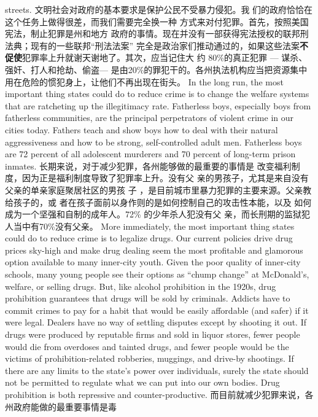 \begin{paracol}{2}
streets.
\switchcolumn
文明社会对政府的基本要求是保护公民不受暴力侵犯。我
们的政府恰恰在这个任务上做得很差，而我们需要完全换一种
方式来对付犯罪。首先，按照美国宪法，制止犯罪是州和地方
政府的事情。现在并没有一部获得宪法授权的联邦刑法典；现有的一些联邦“刑法法案” 完全是政治家们推动通过的，如果这些法案\textbf{不促使}犯罪率上升就谢天谢地了。其次，应当记住大 约 80\%的真正犯罪 --- 谋杀、强奸、打人和抢劫、偷盗--- 是由20\%的罪犯干的。各州执法机构应当把资源集中用在危险的惯犯身上，让他们不再出现在街头。
\switchcolumn*
In the long run, the most important thing states could do to
reduce crime is to change the welfare systems that are ratcheting up the illegitimacy rate. Fatherless boys, especially boys
from fatherless communities, are the principal perpetrators of
violent crime in our cities today. Fathers teach and show boys
how to deal with their natural aggressiveness and how to be
strong, self-controlled adult men. Fatherless boys are 72 percent of all adolescent murderers and 70 percent of long-term
prison inmates.
\switchcolumn
长期来说，对于减少犯罪，各州能够做的最重要的事情是
改变福利制度，因为正是福利制度导致了犯罪率上升。没有父
亲的男孩子，尤其是来自没有父亲的单亲家庭聚居社区的男孩
子 ，是目前城市里暴力犯罪的主要来源。父亲教给孩子的，或
者在孩子面前以身作则的是如何控制自己的攻击性本能，以及
如何成为一个坚强和自制的成年人。72\% 的少年杀人犯没有父
亲，而长刑期的监狱犯人当中有70\%没有父亲。
\switchcolumn*
More immediately, the most important thing states could do
to reduce crime is to legalize drugs. Our current policies drive
drug prices sky-high and make drug dealing seem the most profitable and glamorous option available to many inner-city
youth. Given the poor quality of inner-city schools, many
young people see their options as ``chump change'' at McDonald's, welfare, or selling drugs. But, like alcohol prohibition in
the 1920s, drug prohibition guarantees that drugs will be sold
by criminals. Addicts have to commit crimes to pay for a habit
that would be easily affordable (and safer) if it were legal. Dealers have no way of settling disputes except by shooting it out. If
drugs were produced by reputable firms and sold in liquor
stores, fewer people would die from overdoses and tainted
drugs, and fewer people would be the victims of prohibition-related robberies, muggings, and drive-by shootings. If there are
any limits to the state's power over individuals, surely the state
should not be permitted to regulate what we can put into our
own bodies. Drug prohibition is both repressive and counter-productive.
\switchcolumn
而目前就减少犯罪来说，各州政府能做的最重要事情是毒

\end{paracol}
